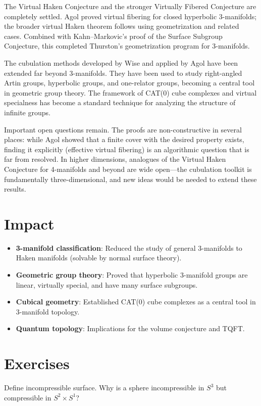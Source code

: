 The Virtual Haken Conjecture and the stronger Virtually Fibered Conjecture are completely settled. Agol proved virtual fibering for closed hyperbolic 3-manifolds; the broader virtual Haken theorem follows using geometrization and related cases. Combined with Kahn--Markovic's proof of the Surface Subgroup Conjecture, this completed Thurston's geometrization program for 3-manifolds.

The cubulation methods developed by Wise and applied by Agol have been extended far beyond 3-manifolds. They have been used to study right-angled Artin groups, hyperbolic groups, and one-relator groups, becoming a central tool in geometric group theory. The framework of CAT(0) cube complexes and virtual specialness has become a standard technique for analyzing the structure of infinite groups.

Important open questions remain. The proofs are non-constructive in several places: while Agol showed that a finite cover with the desired property exists, finding it explicitly (effective virtual fibering) is an algorithmic question that is far from resolved. In higher dimensions, analogues of the Virtual Haken Conjecture for 4-manifolds and beyond are wide open---the cubulation toolkit is fundamentally three-dimensional, and new ideas would be needed to extend these results.

\section{Impact}
\begin{itemize}
\item \textbf{3-manifold classification}: Reduced the study of general 3-manifolds to Haken manifolds (solvable by normal surface theory).
\item \textbf{Geometric group theory}: Proved that hyperbolic 3-manifold groups are linear, virtually special, and have many surface subgroups.
\item \textbf{Cubical geometry}: Established CAT(0) cube complexes as a central tool in 3-manifold topology.
\item \textbf{Quantum topology}: Implications for the volume conjecture and TQFT.
\end{itemize}

\section{Exercises}

\begin{exercise}[Basic]
Define incompressible surface. Why is a sphere incompressible in $S^3$ but compressible in $S^2 \times S^1$?
\end{exercise}

